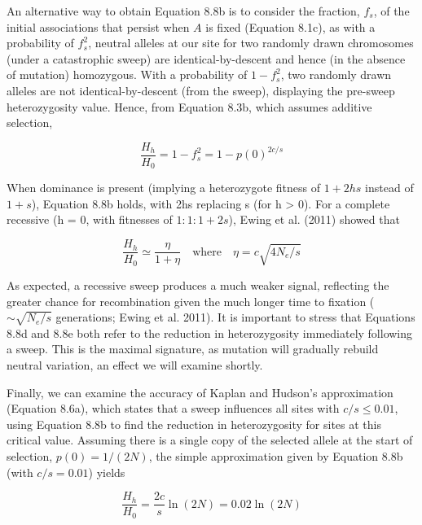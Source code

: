 \documentclass{article}
\begin{document}
An alternative way to obtain Equation 8.8b is to consider the fraction,  $ f_s $, of the initial associations that persist when  $ A $ is fixed (Equation 8.1c), as with a probability of  $ f_s^2 $, neutral alleles at our site for two randomly drawn chromosomes (under a catastrophic sweep) are identical-by-descent and hence (in the absence of mutation) homozygous. With a probability of  $ 1 - f_s^2 $, two randomly drawn alleles are not identical-by-descent (from the sweep), displaying the pre-sweep heterozygosity value. Hence, from Equation 8.3b, which assumes additive selection,

\begin{equation}
\frac{H_{h}}{H_{0}}=1-f_{s}^{2}=1-p(0)^{2c/s}
\tag{8.8d}
\label{eq:8_8d}
\end{equation}

When dominance is present (implying a heterozygote fitness of  $ 1+2hs $ instead of  $ 1+s $), Equation 8.8b holds, with 2hs replacing s (for h > 0). For a complete recessive (h = 0, with fitnesses of  $ 1:1:1+2s $), Ewing et al. (2011) showed that

\begin{equation}
\frac{H_{h}}{H_{0}}\simeq\frac{\eta}{1+\eta}\quad\mathrm{w h e r e}\quad\eta=c\sqrt{4N_{e}/s}
\tag{8.8e}
\label{eq:8_8e}
\end{equation}

As expected, a recessive sweep produces a much weaker signal, reflecting the greater chance for recombination given the much longer time to fixation ( $ \sim\sqrt{N_e/s} $ generations; Ewing et al. 2011). It is important to stress that Equations 8.8d and 8.8e both refer to the reduction in heterozygosity immediately following a sweep. This is the maximal signature, as mutation will gradually rebuild neutral variation, an effect we will examine shortly.

Finally, we can examine the accuracy of Kaplan and Hudson's approximation (Equation 8.6a), which states that a sweep influences all sites with  $ c/s \leq 0.01 $, using Equation 8.8b to find the reduction in heterozygosity for sites at this critical value. Assuming there is a single copy of the selected allele at the start of selection,  $ p(0) = 1/(2N) $, the simple approximation given by Equation 8.8b (with  $ c/s = 0.01 $) yields

\begin{equation}
\frac{H_{h}}{H_{0}}=\frac{2c}{s}\ln(2N)=0.02\ln(2N)
\tag{8.9}
\label{eq:8_9}
\end{equation}
\end{document}
